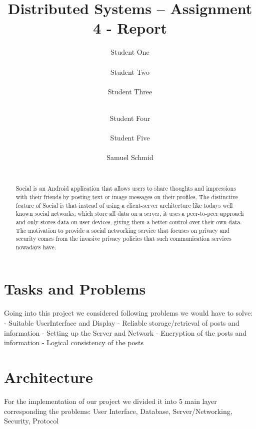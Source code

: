 \documentclass{report}
\title{Distributed Systems -- Assignment 4 - Report}
\author{
%
%
\alignauthor Student One\\
	\affaddr{ETH ID XX-XXX-XXX}\\
	\email{one@student.ethz.ch}
\alignauthor Student Two\\
	\affaddr{ETH ID XX-XXX-XXX}\\
	\email{two@student.ethz.ch}
\alignauthor Student Three\\
	\affaddr{ETH ID XX-XXX-XXX}\\
	\email{three@student.ethz.ch}
\and  %
\alignauthor Student Four\\
 	\affaddr{ETH ID XX-XXX-XXX}\\
 	\email{four@student.ethz.ch}
\alignauthor Student Five\\
 	\affaddr{ETH ID XX-XXX-XXX}\\
 	\email{five@student.ethz.ch}
\alignauthor Samuel Schmid\\
 	\affaddr{ETH ID 10-919-991}\\
 	\email{schmisam@student.ethz.ch}
}
\begin{document}
\maketitle

\begin{abstract}
Social is an Android application that allows users to share thoughts and impressions with their friends by posting text or image messages on their profiles.
The distinctive feature of Social is that instead of using a client-server architecture like todays well known social networks, which store all data on a server, it uses a peer-to-peer approach and only stores data on user devices, giving them a better control over their own data.
The motivation to provide a social networking service that focuses on privacy and security comes from the invasive privacy policies that such communication services nowadays have.
\end{abstract}

\section{Tasks and Problems}

Going into this project we considered following problems we would have to solve: \newline
- Suitable UserInterface and Display \newline
- Reliable storage/retrieval of posts and information \newline
- Setting up the Server and Network \newline
- Encryption of the posts and information \newline
- Logical consistency of the posts \newline



\section{Architecture}

For the implementation of our project we divided it into 5 main layer corresponding the problems: User Interface, Database, Server/Networking, Security, Protocol
\end{document}
